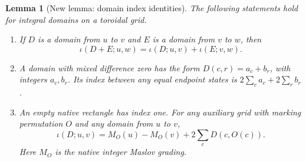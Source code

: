 \documentclass[11pt,oneside]{report}
\newtheorem{lemma}[theorem]{Lemma}
\theoremstyle{definition}
\numberwithin{equation}{section}
\begin{document}
\begin{lemma}[New lemma: domain index identities]
\label{J07:lem:seam-domain-index}
The following statements hold for integral domains on a toroidal grid.
\begin{enumerate}
\item If $D$ is a domain from $u$ to $v$ and $E$ is a domain from
$v$ to $w$, then
\[
 \iota(D+E;u,w)=\iota(D;u,v)+\iota(E;v,w).
\]
\item A domain with mixed difference zero has the form
$D(c,r)=a_c+b_r$, with integers $a_c,b_r$. Its index between any equal
endpoint states is $2\sum_c a_c+2\sum_r b_r$.
\item An empty native rectangle has index one. For any auxiliary
grid with marking permutation $O$ and any domain from $u$ to $v$,
\begin{equation}\label{J07:eq:seam-domain-maslov}
 \iota(D;u,v)=M_O(u)-M_O(v)+2\sum_c D(c,O(c)).
\end{equation}
Here $M_O$ is the native integer Maslov grading.
\end{enumerate}
\end{lemma}
\end{document}
